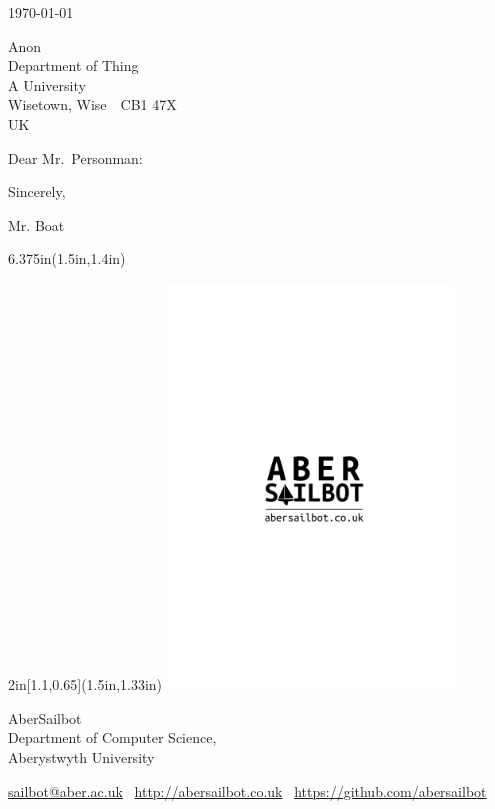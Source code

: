 \documentclass{article}
\begin{document}
\today
\bigskip

Anon\\
Department of Thing\\
A University \\
Wisetown, Wise\ \ CB1 47X\\
UK

Dear Mr.~Personman:

\lipsum[1]

Sincerely,
\vspace{4\baselineskip}

Mr. Boat \\

\begin{textblock*}{6.375in}(1.5in,1.4in)

\begin{textblock*}{2in}[1.1,0.65](1.5in,1.33in)
    \includegraphics[width=3in]{abersailbot-logo}
\end{textblock*}

    \sffamily
    \hfill \color{sailbotgray} AberSailbot\\
    \hfill Department of Computer Science, \\
    \hfill Aberystwyth University
\end{textblock*}

\vfill
{\footnotesize\color{sailbotgray}\sffamily
 \url{sailbot@aber.ac.uk} \textbullet\ \url{http://abersailbot.co.uk} \textbullet\ \url{https://github.com/abersailbot}
}
\end{document}
